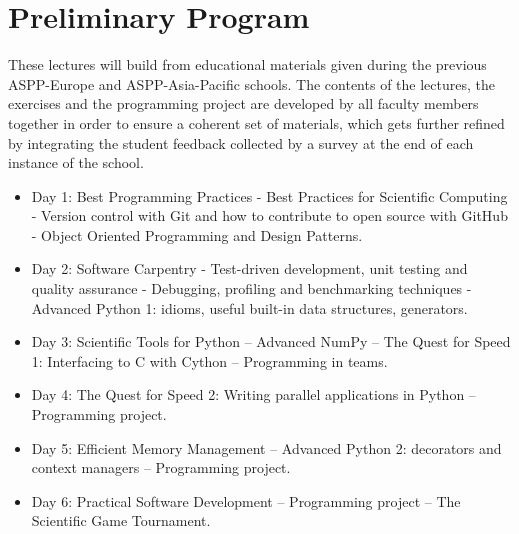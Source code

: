 \documentclass{article}[11pt]
\begin{document}
\section*{Preliminary Program}
These lectures will build from educational materials given during the previous
ASPP-Europe and ASPP-Asia-Pacific schools. The contents of the lectures, the
exercises and the programming project are developed by all faculty members
together in order to ensure a coherent set of materials, which gets further
refined by integrating the student feedback collected by a survey at the end of
each instance of the school.

\begin{itemize}
\item Day 1: Best Programming Practices - Best Practices for Scientific
Computing - Version control with Git and how to contribute to open source with
GitHub - Object Oriented Programming and Design Patterns.

\item Day 2: Software Carpentry - Test-driven development, unit testing and
quality assurance - Debugging, profiling and benchmarking techniques -
Advanced Python 1: idioms, useful built-in data structures, generators.

\item Day 3: Scientific Tools for Python – Advanced NumPy – The Quest for
Speed 1: Interfacing to C with Cython – Programming in teams.

\item Day 4: The Quest for Speed 2: Writing parallel applications in Python  –
Programming project.

\item Day 5: Efficient Memory Management – Advanced Python 2: decorators and
context managers – Programming project.

\item Day 6: Practical Software Development – Programming project – The
Scientific Game Tournament.
\end{itemize}

\end{document}
